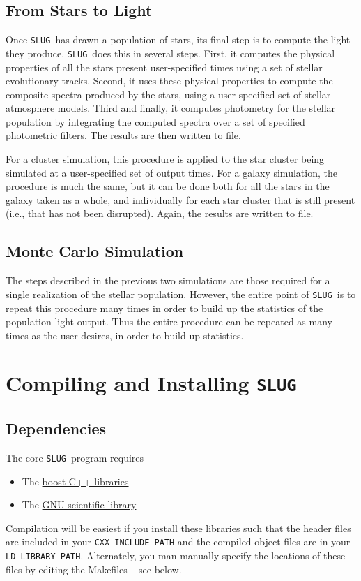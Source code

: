 \documentclass[12pt]{article}
\newcommand{\slug}{\texttt{SLUG}}
\begin{document}
\subsection{From Stars to Light}

Once \slug\ has drawn a population of stars, its final step is to compute the light they produce. \slug\ does this in several steps. First, it computes the physical properties of all the stars present user-specified times using a set of stellar evolutionary tracks. Second, it uses these physical properties to compute the composite spectra produced by the stars, using a user-specified set of stellar atmosphere models. Third and finally, it computes photometry for the stellar population by integrating the computed spectra over a set of specified photometric filters. The results are then written to file.

For a cluster simulation, this procedure is applied to the star cluster being simulated at a user-specified set of output times. For a galaxy simulation, the procedure is much the same, but it can be done both for all the stars in the galaxy taken as a whole, and individually for each star cluster that is still present (i.e., that has not been disrupted). Again, the results are written to file.

\subsection{Monte Carlo Simulation}

The steps described in the previous two simulations are those required for a single realization of the stellar population. However, the entire point of \slug\ is to repeat this procedure many times in order to build up the statistics of the population light output. Thus the entire procedure can be repeated as many times as the user desires, in order to build up statistics.

\section{Compiling and Installing \slug}

\subsection{Dependencies}

The core \slug\ program requires
\begin{itemize}
\item The \href{http://www.boost.org/}{boost C++ libraries}
\item The \href{http://www.gnu.org/software/gsl/}{GNU scientific library}
\end{itemize}
Compilation will be easiest if you install these libraries such that the header files are included in your \verb=CXX_INCLUDE_PATH= and the compiled object files are in your \verb=LD_LIBRARY_PATH=. Alternately, you man manually specify the locations of these files by editing the Makefiles -- see below.
\end{document}
